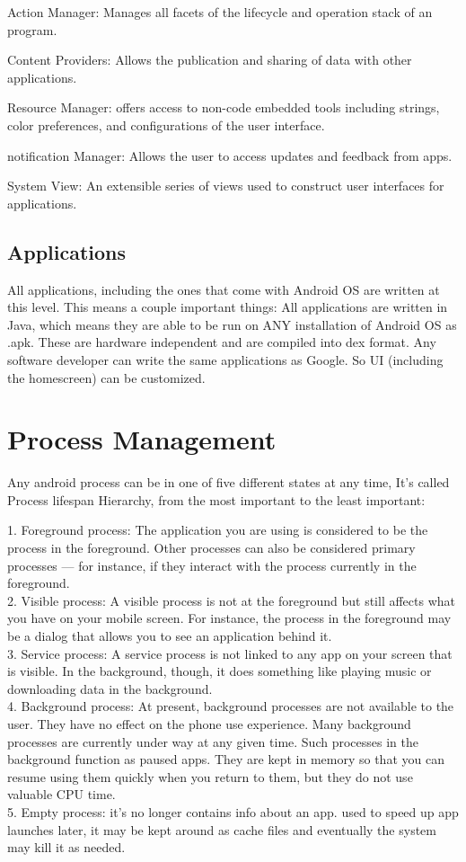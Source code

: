 \documentclass[preprint,12pt]{elsarticle}
\begin{document}
Action Manager: Manages all facets of the lifecycle and operation stack of an program. 

Content Providers: Allows the publication and sharing of data with other applications. 

Resource Manager: offers access to non-code embedded tools including strings, color preferences, and configurations of the user interface.  

 notification Manager: Allows the user to access updates and feedback from apps. 

System View: An extensible series of views used to construct user interfaces for applications.\cite{8}

\subsection{Applications}

All applications, including the ones that come with Android OS are written at this level. This means a couple important things:
All applications are written in Java, which means they are able to be run on ANY installation of Android OS as .apk. These are hardware independent and are compiled into dex format.
Any software developer can write the same applications as Google. So UI (including the homescreen) can be customized.


\section{\large{Process Management}}

Any android process can be in one of five different states at any time, It's called Process lifespan Hierarchy, from the most important to the least important:

1. Foreground process: The application you are using is considered to be the process in the foreground. Other processes can also be considered primary processes — for instance, if they interact with the process currently in the foreground.\\
2. Visible process: A visible process is not at the foreground but still affects what you have on your mobile screen. For instance, the process in the foreground may be a dialog that allows you to see an application behind it. \\
3. Service process: A service process is not linked to any app on your screen that is visible. In the background, though, it does something like playing music or downloading data in the background.
\\
4. Background process: At present, background processes are not available to the user. They have no effect on the phone use experience. Many background processes are currently under way at any given time. Such processes in the background function as paused apps. They are kept in memory so that you can resume using them quickly when you return to them, but they do not use valuable CPU time.\\ 
5. Empty process: it's  no longer contains info about an app. used to speed up app launches later, it may be kept around as cache files and eventually the system may kill it as needed.
\end{document}

